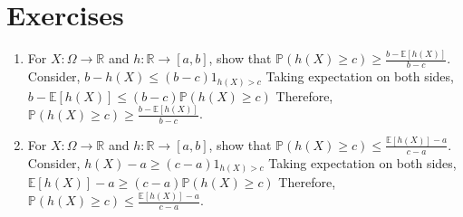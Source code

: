 

\section{Exercises}

\begin{enumerate}
	\item For $X: \Omega \rightarrow \mathbb{R}$ and $h: \mathbb{R} \rightarrow [a, b]$, show that $\mathbb{P}(h(X) \geq c) \geq \displaystyle\frac{b - \mathbb{E}[h(X)]}{b - c}$.
    	\newline Consider, $b - h(X) \leq (b - c) 1_{h(X) > c}$
    	\newline Taking expectation on both sides,
   	 \newline $b - \mathbb{E}[h(X)]  \leq (b - c) \mathbb{P}(h(X) \geq c)$
   	 \newline Therefore, $\mathbb{P}(h(X) \geq c) \geq \displaystyle\frac{b - \mathbb{E}[h(X)]}{b - c}$.

	\item For $X: \Omega \rightarrow \mathbb{R}$ and $h: \mathbb{R} \rightarrow [a, b]$, show that $\mathbb{P}(h(X) \geq c) \leq \displaystyle\frac{\mathbb{E}[h(X)] - a}{c - a}$.
    	\newline Consider, $h(X) - a \geq (c - a) 1_{h(X) > c}$
    	\newline Taking expectation on both sides,
   	 \newline $\mathbb{E}[h(X)] - a \geq (c - a) \mathbb{P}(h(X) \geq c)$
   	 \newline Therefore, $\mathbb{P}(h(X) \geq c) \leq \displaystyle\frac{\mathbb{E}[h(X)] - a}{c - a}$.

	
	
\end{enumerate}